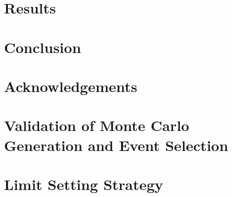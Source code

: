 \documentclass[a4paper,11pt]{article}
\renewcommand{\=}[1]{\stackrel{#1}{=}} %
\begin{document}
\section{Results} 
\label{sec:sec4}

\section{Conclusion} 
\label{sec:sec5}


\section{Acknowledgements} 
\label{sec:sec6}

\appendix
\section{Validation of Monte Carlo Generation and Event Selection }
\label{AppendixA}


\section{Limit Setting Strategy}
\label{AppendixB}


\begin{thebibliography}{99}

\end{thebibliography}
\end{document}
